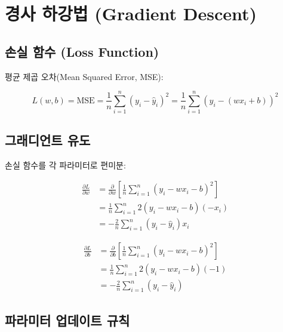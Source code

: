 \documentclass[11pt,a4paper]{article}
\begin{document}
\section{ 경사 하강법 (Gradient Descent)}

\subsection{손실 함수 (Loss Function)}

평균 제곱 오차(Mean Squared Error, MSE):

\begin{tcolorbox}[colback=lightcyan,colframe=teal,title=\textbf{\texttwemoji{bar chart} MSE 손실 함수}]
\begin{equation}
L(w, b) = \text{MSE} = \frac{1}{n} \sum_{i=1}^{n} \left( y_i - \hat{y}_i \right)^2 = \frac{1}{n} \sum_{i=1}^{n} \left( y_i - (wx_i + b) \right)^2
\end{equation}
\end{tcolorbox}

\subsection{그래디언트 유도}

손실 함수를 각 파라미터로 편미분:

\begin{tcolorbox}[colback=lightblue,colframe=darkblue,title=\textbf{그래디언트 계산}]
\begin{align}
\frac{\partial L}{\partial w} &= \frac{\partial}{\partial w} \left[ \frac{1}{n} \sum_{i=1}^{n} (y_i - wx_i - b)^2 \right] \\
&= \frac{1}{n} \sum_{i=1}^{n} 2(y_i - wx_i - b)(-x_i) \\
&= \boxed{-\frac{2}{n} \sum_{i=1}^{n} (y_i - \hat{y}_i) x_i}
\end{align}

\begin{align}
\frac{\partial L}{\partial b} &= \frac{\partial}{\partial b} \left[ \frac{1}{n} \sum_{i=1}^{n} (y_i - wx_i - b)^2 \right] \\
&= \frac{1}{n} \sum_{i=1}^{n} 2(y_i - wx_i - b)(-1) \\
&= \boxed{-\frac{2}{n} \sum_{i=1}^{n} (y_i - \hat{y}_i)}
\end{align}
\end{tcolorbox}

\subsection{파라미터 업데이트 규칙}
\end{document}

